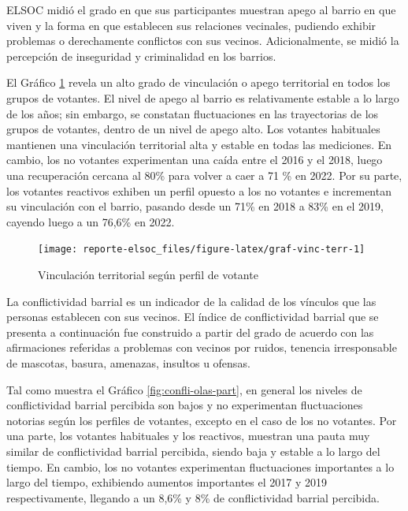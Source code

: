 \documentclass[
  12pt,
]{book}
\begin{document}
ELSOC midió el grado en que sus participantes muestran apego al barrio en que viven y la forma en que establecen sus relaciones vecinales, pudiendo exhibir problemas o derechamente conflictos con sus vecinos. Adicionalmente, se midió la percepción de inseguridad y criminalidad en los barrios.

El Gráfico \ref{fig:graf-vinc-terr} revela un alto grado de vinculación o apego territorial en todos los grupos de votantes. El nivel de apego al barrio es relativamente estable a lo largo de los años; sin embargo, se constatan fluctuaciones en las trayectorias de los grupos de votantes, dentro de un nivel de apego alto. Los votantes habituales mantienen una vinculación territorial alta y estable en todas las mediciones. En cambio, los no votantes experimentan una caída entre el 2016 y el 2018, luego una recuperación cercana al 80\% para volver a caer a 71 \% en 2022. Por su parte, los votantes reactivos exhiben un perfil opuesto a los no votantes e incrementan su vinculación con el barrio, pasando desde un 71\% en 2018 a 83\% en el 2019, cayendo luego a un 76,6\% en 2022.

\begin{figure}

{\centering \texttt{[image: reporte-elsoc\_files/figure-latex/graf-vinc-terr-1]} 

}

\caption{Vinculación territorial según perfil de votante}\label{fig:graf-vinc-terr}
\end{figure}

La conflictividad barrial es un indicador de la calidad de los vínculos que las personas establecen con sus vecinos. El índice de conflictividad barrial que se presenta a continuación fue construido a partir del grado de acuerdo con las afirmaciones referidas a problemas con vecinos por ruidos, tenencia irresponsable de mascotas, basura, amenazas, insultos u ofensas.

Tal como muestra el Gráfico \ref{fig:confli-olas-part}, en general los niveles de conflictividad barrial percibida son bajos y no experimentan fluctuaciones notorias según los perfiles de votantes, excepto en el caso de los no votantes. Por una parte, los votantes habituales y los reactivos, muestran una pauta muy similar de conflictividad barrial percibida, siendo baja y estable a lo largo del tiempo. En cambio, los no votantes experimentan fluctuaciones importantes a lo largo del tiempo, exhibiendo aumentos importantes el 2017 y 2019 respectivamente, llegando a un 8,6\% y 8\% de conflictividad barrial percibida.
\end{document}
